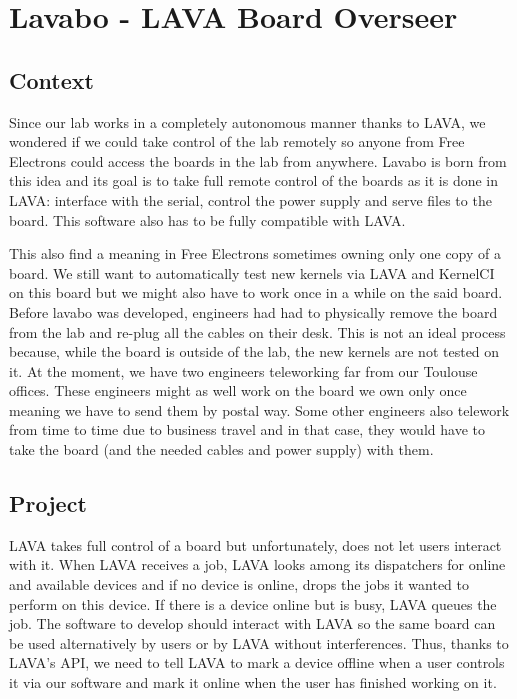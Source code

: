 \chapter{Lavabo - LAVA Board Overseer}
\section{Context}

Since our lab works in a completely autonomous manner thanks to LAVA, we wondered if we could take control of the lab remotely so anyone from Free Electrons could access the boards in the lab from anywhere. Lavabo is born from this idea and its goal is to take full remote control of the boards as it is done in LAVA: interface with the serial, control the power supply and serve files to the board. This software also has to be fully compatible with LAVA.

This also find a meaning in Free Electrons sometimes owning only one copy of a board. We still want to automatically test new kernels via LAVA and KernelCI on this board but we might also have to work once in a while on the said board. Before lavabo was developed, engineers had had to physically remove the board from the lab and re-plug all the cables on their desk. This is not an ideal process because, while the board is outside of the lab, the new kernels are not tested on it. At the moment, we have two engineers teleworking far from our Toulouse offices. These engineers might as well work on the board we own only once meaning we have to send them by postal way. Some other engineers also telework from time to time due to business travel and in that case, they would have to take the board (and the needed cables and power supply) with them.

\section{Project}

LAVA takes full control of a board but unfortunately, does not let users interact with it. When LAVA receives a job, LAVA looks among its dispatchers for online and available devices and if no device is online, drops the jobs it wanted to perform on this device. If there is a device online but is busy, LAVA queues the job. The software to develop should interact with LAVA so the same board can be used alternatively by users or by LAVA without interferences. Thus, thanks to LAVA's API, we need to tell LAVA to mark a device offline when a user controls it via our software and mark it online when the user has finished working on it.

